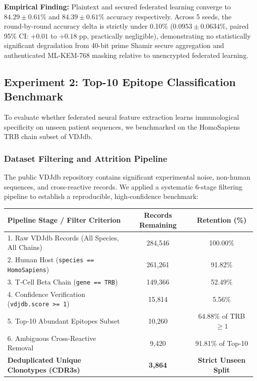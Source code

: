 \documentclass[11pt,a4paper]{article}
\begin{document}
\textbf{Empirical Finding:} Plaintext and secured federated learning converge to $84.29 \pm 0.61\%$ and $84.39 \pm 0.61\%$ accuracy respectively. Across 5 seeds, the round-by-round accuracy delta is strictly under 0.10\% ($0.0953 \pm 0.0634\%$, paired 95\% CI: $+0.01$ to $+0.18$ pp, practically negligible), demonstrating no statistically significant degradation from 40-bit prime Shamir secure aggregation and authenticated ML-KEM-768 masking relative to unencrypted federated learning.

\subsection{Experiment 2: Top-10 Epitope Classification Benchmark}
\label{sec:top10_benchmark}
To evaluate whether federated neural feature extraction learns immunological specificity on unseen patient sequences, we benchmarked on the HomoSapiens TRB chain subset of VDJdb. 

\subsubsection{Dataset Filtering and Attrition Pipeline}
The public VDJdb repository contains significant experimental noise, non-human sequences, and cross-reactive records. We applied a systematic 6-stage filtering pipeline to establish a reproducible, high-confidence benchmark:

\begin{center}
\begin{longtable}{@{}p{6.2cm}cc@{}}
\toprule
\textbf{Pipeline Stage / Filter Criterion} & \textbf{Records Remaining} & \textbf{Retention (\%)} \\
\midrule
\endhead
1. Raw VDJdb Records (All Species, All Chains) & 284{,}546 & 100.00\% \\
2. Human Host (\lstinline|species == HomoSapiens|) & 261{,}261 & 91.82\% \\
3. T-Cell Beta Chain (\lstinline|gene == TRB|) & 149{,}366 & 52.49\% \\
4. Confidence Verification (\lstinline|vdjdb.score >= 1|) & 15{,}814 & 5.56\% \\
5. Top-10 Abundant Epitopes Subset & 10{,}260 & 64.88\% of TRB $\ge 1$ \\
6. Ambiguous Cross-Reactive Removal & 9{,}420 & 91.81\% of Top-10 \\
\midrule
\textbf{Deduplicated Unique Clonotypes (CDR3s)} & \textbf{3{,}864} & \textbf{Strict Unseen Split} \\
\bottomrule
\end{longtable}
\end{center}
\end{document}
